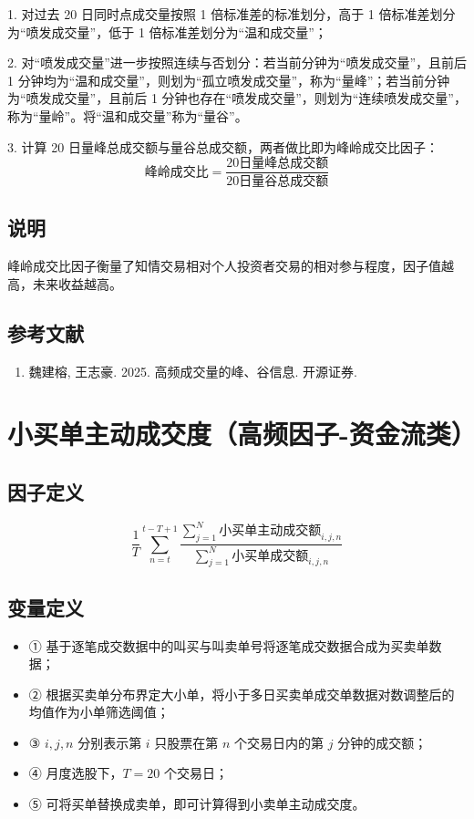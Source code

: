 \documentclass{article}
\begin{document}
1. 对过去 20 日同时点成交量按照 1 倍标准差的标准划分，高于 1 倍标准差划分为“喷发成交量”，低于 1 倍标准差划分为“温和成交量”；

2. 对“喷发成交量”进一步按照连续与否划分：若当前分钟为“喷发成交量”，且前后 1 分钟均为“温和成交量”，则划为“孤立喷发成交量”，称为“量峰”；若当前分钟为“喷发成交量”，且前后 1 分钟也存在“喷发成交量”，则划为“连续喷发成交量”，称为“量岭”。将“温和成交量”称为“量谷”。

3. 计算 20 日量峰总成交额与量谷总成交额，两者做比即为峰岭成交比因子：
\begin{equation}
    \text{峰岭成交比} = \frac{\text{20日量峰总成交额}}{\text{20日量谷总成交额}}
\end{equation}

\subsection{说明}
峰岭成交比因子衡量了知情交易相对个人投资者交易的相对参与程度，因子值越高，未来收益越高。

\subsection{参考文献}
\begin{enumerate}
    \item 魏建榕, 王志豪. 2025. 高频成交量的峰、谷信息. 开源证券.
\end{enumerate}

\section{小买单主动成交度（高频因子-资金流类）}

\subsection{因子定义}
\begin{equation}
    \frac{1}{T} \sum_{n=t}^{t-T+1} \frac{\sum_{j=1}^{N} \text{小买单主动成交额}_{i,j,n}}{\sum_{j=1}^{N} \text{小买单成交额}_{i,j,n}}
\end{equation}

\subsection{变量定义}
\begin{itemize}
    \item ① 基于逐笔成交数据中的叫买与叫卖单号将逐笔成交数据合成为买卖单数据；
    \item ② 根据买卖单分布界定大小单，将小于多日买卖单成交单数据对数调整后的均值作为小单筛选阈值；
    \item ③ \( i, j, n \) 分别表示第 \( i \) 只股票在第 \( n \) 个交易日内的第 \( j \) 分钟的成交额；
    \item ④ 月度选股下，\( T=20 \) 个交易日；
    \item ⑤ 可将买单替换成卖单，即可计算得到小卖单主动成交度。
\end{itemize}
\end{document}
